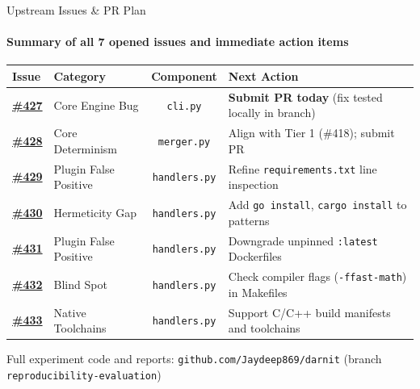 \documentclass[aspectratio=169]{beamer}
\begin{document}
\begin{frame}{Upstream Issues \& PR Plan}
    \framesubtitle{Summary of all 7 opened issues and immediate action items}
    \small
    \begin{table}
        \centering
        \begin{tabular}{llcp{4.5cm}}
            \toprule
            \textbf{Issue} & \textbf{Category} & \textbf{Component} & \textbf{Next Action} \\
            \midrule
            \href{https://github.com/darnitdevorg/darnit/issues/427}{\textbf{\#427}} & Core Engine Bug & \texttt{cli.py} & \textbf{Submit PR today} (fix tested locally in branch) \\
            \href{https://github.com/darnitdevorg/darnit/issues/428}{\textbf{\#428}} & Core Determinism & \texttt{merger.py} & Align with Tier 1 (\#418); submit PR \\
            \href{https://github.com/darnitdevorg/darnit/issues/429}{\textbf{\#429}} & Plugin False Positive & \texttt{handlers.py} & Refine \texttt{requirements.txt} line inspection \\
            \href{https://github.com/darnitdevorg/darnit/issues/430}{\textbf{\#430}} & Hermeticity Gap & \texttt{handlers.py} & Add \texttt{go install}, \texttt{cargo install} to patterns \\
            \href{https://github.com/darnitdevorg/darnit/issues/431}{\textbf{\#431}} & Plugin False Positive & \texttt{handlers.py} & Downgrade unpinned \texttt{:latest} Dockerfiles \\
            \href{https://github.com/darnitdevorg/darnit/issues/432}{\textbf{\#432}} & Blind Spot & \texttt{handlers.py} & Check compiler flags (\texttt{-ffast-math}) in Makefiles \\
            \href{https://github.com/darnitdevorg/darnit/issues/433}{\textbf{\#433}} & Native Toolchains & \texttt{handlers.py} & Support C/C++ build manifests and toolchains \\
            \bottomrule
        \end{tabular}
    \end{table}
    \vspace{0.2cm}
    \centering
    \footnotesize Full experiment code and reports: \texttt{github.com/Jaydeep869/darnit} (branch \texttt{reproducibility-evaluation})
\end{frame}
\end{document}
